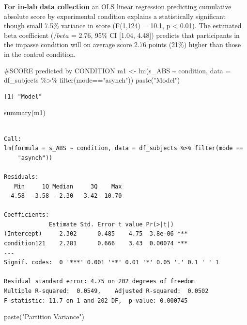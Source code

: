 \documentclass[
  letterpaper,
  DIV=11,
  numbers=noendperiod]{scrreprt}
\newenvironment{Shaded}{\begin{snugshade}}{\end{snugshade}}
\newcommand{\AttributeTok}[1]{\textcolor[rgb]{0.40,0.45,0.13}{#1}}
\newcommand{\CommentTok}[1]{\textcolor[rgb]{0.37,0.37,0.37}{#1}}
\newcommand{\FunctionTok}[1]{\textcolor[rgb]{0.28,0.35,0.67}{#1}}
\newcommand{\NormalTok}[1]{\textcolor[rgb]{0.00,0.23,0.31}{#1}}
\newcommand{\OtherTok}[1]{\textcolor[rgb]{0.00,0.23,0.31}{#1}}
\newcommand{\SpecialCharTok}[1]{\textcolor[rgb]{0.37,0.37,0.37}{#1}}
\newcommand{\StringTok}[1]{\textcolor[rgb]{0.13,0.47,0.30}{#1}}
\begin{document}
\textbf{For in-lab data collection} an OLS linear regression predicting
cumulative absolute score by experimental condition explains a
statistically significant though small 7.5\% variance in score (F(1,124)
= 10.1, p \textless{} 0.01). The estimated beta coefficient (\(/beta\) =
2.76, 95\% CI {[}1.04, 4.48{]}) predicts that participants in the
impasse condition will on average score 2.76 points (21\%) higher than
those in the control condition.

\begin{Shaded}
\begin{Highlighting}[]
\CommentTok{\#SCORE predicted by CONDITION}
\NormalTok{m1 }\OtherTok{\textless{}{-}} \FunctionTok{lm}\NormalTok{(s\_ABS }\SpecialCharTok{\textasciitilde{}}\NormalTok{ condition, }\AttributeTok{data =}\NormalTok{ df\_subjects }\SpecialCharTok{\%\textgreater{}\%} \FunctionTok{filter}\NormalTok{(mode}\SpecialCharTok{==}\StringTok{"asynch"}\NormalTok{))}
\FunctionTok{paste}\NormalTok{(}\StringTok{"Model"}\NormalTok{)}
\end{Highlighting}
\end{Shaded}

\begin{verbatim}
[1] "Model"
\end{verbatim}

\begin{Shaded}
\begin{Highlighting}[]
\FunctionTok{summary}\NormalTok{(m1)}
\end{Highlighting}
\end{Shaded}

\begin{verbatim}

Call:
lm(formula = s_ABS ~ condition, data = df_subjects %>% filter(mode == 
    "asynch"))

Residuals:
   Min     1Q Median     3Q    Max 
 -4.58  -3.58  -2.30   3.42  10.70 

Coefficients:
             Estimate Std. Error t value Pr(>|t|)    
(Intercept)     2.302      0.485    4.75  3.8e-06 ***
condition121    2.281      0.666    3.43  0.00074 ***
---
Signif. codes:  0 '***' 0.001 '**' 0.01 '*' 0.05 '.' 0.1 ' ' 1

Residual standard error: 4.75 on 202 degrees of freedom
Multiple R-squared:  0.0549,    Adjusted R-squared:  0.0502 
F-statistic: 11.7 on 1 and 202 DF,  p-value: 0.000745
\end{verbatim}

\begin{Shaded}
\begin{Highlighting}[]
\FunctionTok{paste}\NormalTok{(}\StringTok{"Partition Variance"}\NormalTok{)}
\end{Highlighting}
\end{Shaded}
\end{document}
